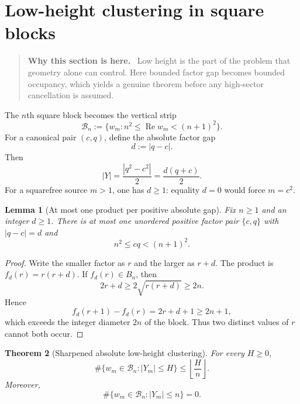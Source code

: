 \documentclass[11pt]{article}
\newtheorem{theorem}{Theorem}[section]
\newtheorem{lemma}[theorem]{Lemma}
\theoremstyle{definition}
\theoremstyle{remark}
\newcommand{\1}{\mathbf{1}}
\newcommand{\Repart}{\operatorname{Re}}
\newenvironment{motivation}
  {\begin{quote}\small\color{ovvogray}\textbf{Why this section is here.}\ }
  {\end{quote}}
\begin{document}
\section{Low-height clustering in square blocks}
\label{sec:clustering}

\begin{motivation}
Low height is the part of the problem that geometry alone can control.  Here bounded factor gap becomes bounded occupancy, which yields a genuine theorem before any high-sector cancellation is assumed.
\end{motivation}

The $n$th square block becomes the vertical strip
\begin{equation}
 \mathscr B_n
 :=\{w_m:n^2\le\Repart w_m<(n+1)^2\}.
 \label{eq:complex-block}
\end{equation}
For a canonical pair $(c,q)$, define the absolute factor gap
\begin{equation}
 d:=|q-c|.
 \label{eq:absolute-gap}
\end{equation}
Then
\begin{equation}
 |Y|
 =\frac{|q^2-c^2|}{2}
 =\frac{d(q+c)}{2}.
 \label{eq:Y-absolute-gap}
\end{equation}
For a squarefree source $m>1$, one has $d\ge1$: equality $d=0$ would
force $m=c^2$.

\begin{lemma}[At most one product per positive absolute gap]
\label{lem:one-product-gap}
Fix $n\ge1$ and an integer $d\ge1$.  There is at most one unordered
positive factor pair $\{c,q\}$ with $|q-c|=d$ and
\begin{equation}
 n^2\le cq<(n+1)^2.
 \label{eq:gap-block-condition}
\end{equation}
\end{lemma}

\begin{proof}
Write the smaller factor as $r$ and the larger as $r+d$.  The product is
$f_d(r)=r(r+d)$.  If $f_d(r)\in B_n$, then
\[
 2r+d\ge2\sqrt{r(r+d)}\ge2n.
\]
Hence
\[
 f_d(r+1)-f_d(r)=2r+d+1\ge2n+1,
\]
which exceeds the integer diameter $2n$ of the block.  Thus two
distinct values of $r$ cannot both occur.
\end{proof}

\begin{theorem}[Sharpened absolute low-height clustering]
\label{thm:absolute-clustering}
For every $H\ge0$,
\begin{equation}
 \boxed{
 \#\{w_m\in\mathscr B_n:|Y_m|\le H\}
 \le
 \left\lfloor\frac{H}{n}\right\rfloor.
 }
 \label{eq:absolute-clustering}
\end{equation}
Moreover,
\begin{equation}
 \boxed{
 \#\{w_m\in\mathscr B_n:|Y_m|\le n\}=0.
 }
 \label{eq:no-height-n-points}
\end{equation}
\end{theorem}
\end{document}

